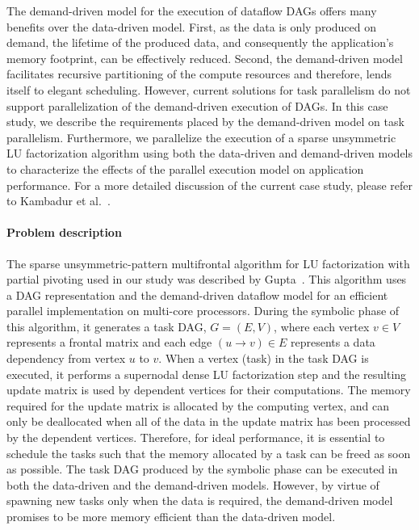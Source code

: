\documentclass{sig-alternate}
\begin{document}
The demand-driven model for the execution of dataflow DAGs offers many benefits
over the data-driven model. First, as the data is only produced on demand, the
lifetime of the produced data, and consequently the application's memory
footprint, can be effectively reduced. Second, the demand-driven model
facilitates recursive partitioning of the compute resources and therefore,
lends itself to elegant scheduling.  However, current solutions for task
parallelism do not support parallelization of the demand-driven execution of
DAGs. In this case study, we describe the requirements placed by the
demand-driven model on task parallelism.  Furthermore, we parallelize the
execution of a sparse unsymmetric LU factorization algorithm using both the
data-driven and demand-driven models to characterize the effects of the
parallel execution model on application performance. For a more detailed 
discussion of the current case study, please refer to Kambadur et
al.~\cite{kambadur09:dag}.

\paragraph{Problem description}
The sparse unsymmetric-pattern multifrontal algorithm for LU factorization with
partial pivoting used in our study was described by
Gupta~\cite{GUPTAsimax01,GUPTA00wsmp2}. This algorithm uses a DAG
representation and the demand-driven dataflow model for an efficient
parallel implementation on multi-core processors.  During the symbolic phase of
this algorithm, it generates a task DAG, $G =(E,V)$, where each vertex $v \in
V$ represents a frontal matrix and each edge $(u \rightarrow{} v) \in E$
represents a data dependency from vertex $u$ to $v$.  When a vertex  (task) in the task DAG is
executed, it performs a supernodal dense LU factorization step and the
resulting update matrix is used by dependent vertices for their computations.
The memory required for the update matrix is allocated by the computing vertex,
and can only be deallocated when all of the data in the update matrix has been
processed by the dependent vertices.  Therefore, for ideal performance, it is
essential to schedule the tasks such that the memory allocated by a task can be
freed as soon as possible. The task DAG produced by the symbolic phase can be
executed in both the data-driven and the demand-driven models. However, by
virtue of spawning new tasks only when the data is required, the demand-driven
model promises to be more memory efficient than the data-driven model.
\end{document}
